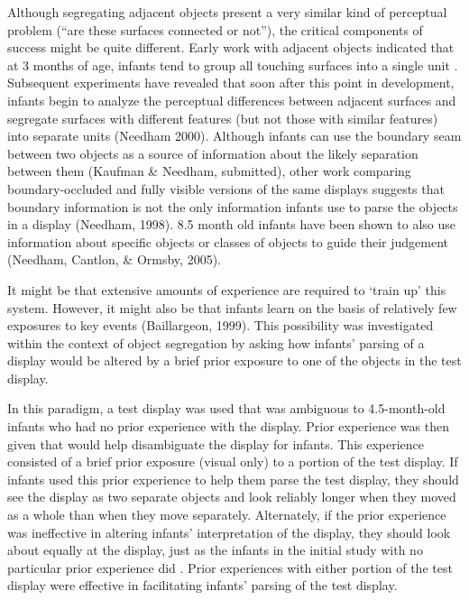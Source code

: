 Although segregating adjacent objects present a very similar kind of
perceptual problem (``are these surfaces connected or not''), the
critical components of success might be quite different.  Early work
with adjacent objects indicated that at 3 months of age, infants tend
to group all touching surfaces into a single unit
\cite{kestenbaum87perception}.  Subsequent experiments have revealed
that soon after this point in development, infants begin to analyze
the perceptual differences between adjacent surfaces and segregate
surfaces with different features (but not those with similar features)
into separate units (Needham 2000).
%
\ifverbose
Although infants can use the boundary seam between
two objects as a source of information about the likely separation
between them (Kaufman \& Needham, submitted), other work comparing
boundary-occluded and fully visible versions of the same displays
suggests that boundary information is not the only information infants
use to parse the objects in a display (Needham, 1998).  
\fi
%
8.5 month old infants have been shown to also use information about specific
objects or classes of objects to guide their judgement (Needham,
Cantlon, \& Ormsby, 2005).



It might be that extensive amounts of experience are required to
`train up' this system.  However, it might also be that infants learn
on the basis of relatively few exposures to key events (Baillargeon,
1999).  This possibility was investigated within the context of object
segregation by asking how infants' parsing of a display would be
altered by a brief prior exposure to one of the objects in the test
display.


In this paradigm, a test display was used that was ambiguous to
4.5-month-old infants who had no prior experience with the display.
Prior experience was then given that would help disambiguate the display
for infants.  This experience consisted of a brief prior exposure
(visual only) to a portion of the test display.  If infants used this
prior experience to help them parse the test display, they should see
the display as two separate objects and look reliably longer when they
moved as a whole than when they move separately.  Alternately, if the
prior experience was ineffective in altering infants'
interpretation of the display, they should look about equally at the
display, just as the infants in the initial study with no particular
prior experience did \cite{needham98effects}.  Prior experiences
with either portion of the test display were effective in facilitating
infants' parsing of the test display.  

